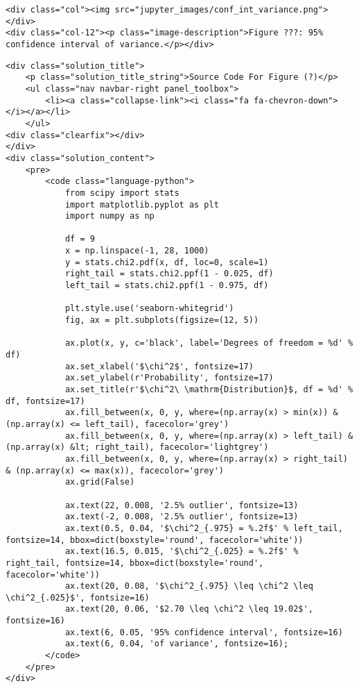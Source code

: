 \documentclass[11pt]{article}
\begin{document}
\begin{verbatim}
<div class="col"><img src="jupyter_images/conf_int_variance.png"></div>
<div class="col-12"><p class="image-description">Figure ???: 95% confidence interval of variance.</p></div>
\end{verbatim}

    \begin{verbatim}
<div class="solution_title">
    <p class="solution_title_string">Source Code For Figure (?)</p>
    <ul class="nav navbar-right panel_toolbox">
        <li><a class="collapse-link"><i class="fa fa-chevron-down"></i></a></li>
    </ul>
<div class="clearfix"></div>
</div>
<div class="solution_content">
    <pre>
        <code class="language-python">
            from scipy import stats
            import matplotlib.pyplot as plt
            import numpy as np

            df = 9
            x = np.linspace(-1, 28, 1000)
            y = stats.chi2.pdf(x, df, loc=0, scale=1)
            right_tail = stats.chi2.ppf(1 - 0.025, df) 
            left_tail = stats.chi2.ppf(1 - 0.975, df) 

            plt.style.use('seaborn-whitegrid')
            fig, ax = plt.subplots(figsize=(12, 5))

            ax.plot(x, y, c='black', label='Degrees of freedom = %d' % df)
            ax.set_xlabel('$\chi^2$', fontsize=17)
            ax.set_ylabel(r'Probability', fontsize=17)
            ax.set_title(r'$\chi^2\ \mathrm{Distribution}$, df = %d' % df, fontsize=17)
            ax.fill_between(x, 0, y, where=(np.array(x) > min(x)) & (np.array(x) <= left_tail), facecolor='grey')
            ax.fill_between(x, 0, y, where=(np.array(x) > left_tail) & (np.array(x) &lt; right_tail), facecolor='lightgrey')
            ax.fill_between(x, 0, y, where=(np.array(x) > right_tail) & (np.array(x) <= max(x)), facecolor='grey')
            ax.grid(False)

            ax.text(22, 0.008, '2.5% outlier', fontsize=13)
            ax.text(-2, 0.008, '2.5% outlier', fontsize=13)
            ax.text(0.5, 0.04, '$\chi^2_{.975} = %.2f$' % left_tail, fontsize=14, bbox=dict(boxstyle='round', facecolor='white'))
            ax.text(16.5, 0.015, '$\chi^2_{.025} = %.2f$' % right_tail, fontsize=14, bbox=dict(boxstyle='round', facecolor='white'))
            ax.text(20, 0.08, '$\chi^2_{.975} \leq \chi^2 \leq \chi^2_{.025}$', fontsize=16)
            ax.text(20, 0.06, '$2.70 \leq \chi^2 \leq 19.02$', fontsize=16)
            ax.text(6, 0.05, '95% confidence interval', fontsize=16)
            ax.text(6, 0.04, 'of variance', fontsize=16);
        </code>
    </pre>
</div>
\end{verbatim}
\end{document}
